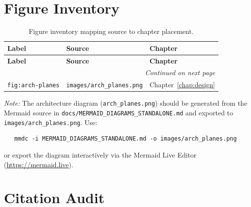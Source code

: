 \section{Figure Inventory}
\label{sec:figure-inventory}

\begin{longtable}{lll}
    \caption{Figure inventory mapping source to chapter placement.}
    \label{tab:figure-inventory} \\
    \toprule
    \textbf{Label} & \textbf{Source} & \textbf{Chapter} \\
    \midrule
    \endfirsthead
    \toprule
    \textbf{Label} & \textbf{Source} & \textbf{Chapter} \\
    \midrule
    \endhead
    \midrule
    \multicolumn{3}{r}{\textit{Continued on next page}} \\
    \endfoot
    \bottomrule
    \endlastfoot
    \texttt{fig:arch-planes}  & \texttt{images/arch\_planes.png}    & Chapter~\ref{chap:design} \\
\end{longtable}

\textit{Note:} The architecture diagram (\texttt{arch\_planes.png}) should be
generated from the Mermaid source in
\texttt{docs/MERMAID\_DIAGRAMS\_STANDALONE.md} and exported to
\texttt{images/arch\_planes.png}. Use:
\begin{verbatim}
   mmdc -i MERMAID_DIAGRAMS_STANDALONE.md -o images/arch_planes.png
\end{verbatim}
or export the diagram interactively via the Mermaid Live Editor
(\url{https://mermaid.live}).

\section{Citation Audit}
\label{sec:citation-audit}

